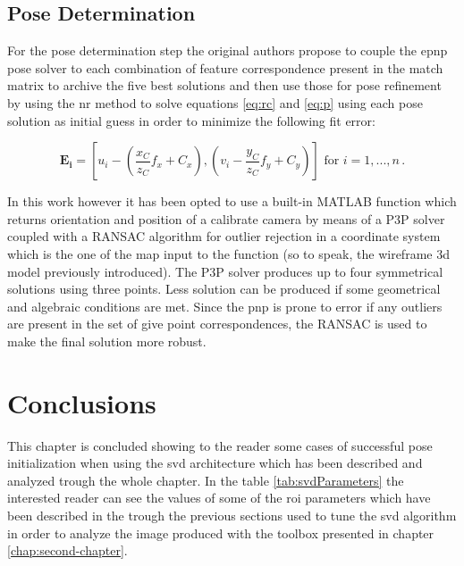 \subsection{Pose Determination}
For the pose determination step the original authors propose to couple the e\acrshort{pnp} pose solver \cite{10.1007/s11263-008-0152-6} to each combination of feature correspondence present in the match matrix to archive the five best solutions and then use those for pose refinement by using the \acrshort{nr} method to solve equations \eqref{eq:rc} and \eqref{eq:p} using each pose solution as initial guess in order to minimize the following fit error:

\begin{equation}
  \mathbf{E_i} = \left[u_i - \left( \frac{x_C}{z_C} f_x + C_x \right) , \left( v_i - \frac{y_C}{z_C} f_y + C_y \right) \right]  \mbox{ for } i=1,...,n \,.
  \label{eq:errorFIT}
\end{equation}

In this work however it has been opted to use a built-in MATLAB function which returns orientation and position of a calibrate camera by means of a P3P solver \cite{XiaoShanGao2003} coupled with a RANSAC algorithm for outlier rejection \cite{Torr2000} in a coordinate system which is the one of the map input to the function (so to speak, the wireframe \acrshort{3d} model previously introduced). The P3P solver produces up to four symmetrical solutions using three points. Less solution can be produced if some geometrical and algebraic conditions are met.
Since the \acrshort{pnp} is prone to error if any outliers are present in the set of give point correspondences, the RANSAC is used to make the final solution more robust.

\section{Conclusions}
This chapter is concluded showing to the reader some cases of successful pose initialization when using the \acrshort{svd} architecture which has been described and analyzed trough the whole chapter. In the table \ref{tab:svdParameters} the interested reader can see the values of some of the \acrshort{roi} parameters which have been described in the trough the previous sections used to tune the \acrshort{svd} algorithm in order to analyze the image produced with the toolbox presented in chapter \ref{chap:second-chapter}.

